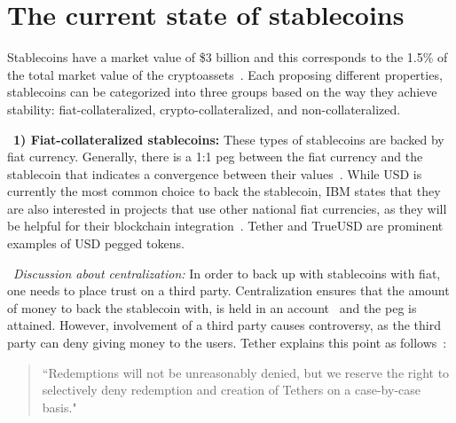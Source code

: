 

\section{The current state of stablecoins} %

Stablecoins have a market value of \$3 billion and this corresponds to the 1.5\% of the total market value of the cryptoassets~\cite{report}. Each proposing different properties, stablecoins can be categorized into three groups based on the way they achieve stability: fiat-collateralized, crypto-collateralized, and non-collateralized.

~\textbf{1) Fiat-collateralized stablecoins:} These types of stablecoins are backed by fiat currency. Generally, there is a 1:1 peg between the fiat currency and the stablecoin that indicates a convergence between their values~\cite{linkedin}. While USD is currently the most common choice to back the stablecoin, IBM states that they are also interested in projects that use other national fiat currencies, as they will be helpful for their blockchain integration~\cite{cointelegraph}. Tether and TrueUSD are prominent examples of USD pegged tokens.

~\textit{Discussion about centralization:} In order to back up with stablecoins with fiat, one needs to place trust on a third party. Centralization ensures that the amount of money to back the stablecoin with, is held in an account~\cite{techrev} and the peg is attained. However, involvement of a third party causes controversy, as the third party can deny giving money to the users. Tether explains this point as follows~\cite{cryptoinsider}:

\begin{quote}
``Redemptions will not be unreasonably denied, but we reserve the right to selectively deny redemption and creation of Tethers on a case-by-case basis."
\end{quote}


